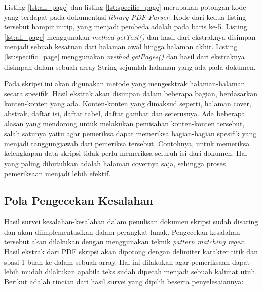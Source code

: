 Listing \ref{lst:all_page} dan listing \ref{lst:specific_page} merupakan potongan kode yang terdapat pada dokumentasi \textit{library PDF Parser}. Kode dari kedua listing tersebut hampir mirip, yang menjadi pembeda adalah pada baris ke-5. Listing \ref{lst:all_page} menggunakan \textit{method getText()} dan hasil dari ekstraknya disimpan menjadi sebuah kesatuan dari halaman awal hingga halaman akhir. Listing \ref{lst:specific_page} menggunakan \textit{method getPages()} dan hasil dari ekstraknya disimpan dalam sebuah array String sejumlah halaman yang ada pada dokumen.

Pada skripsi ini akan digunakan metode yang mengesktrak halaman-halaman secara spesifik. Hasil ekstrak akan disimpan dalam beberapa bagian, berdasarkan konten-konten yang ada. Konten-konten yang dimaksud seperti, halaman cover, abstrak, daftar isi, daftar tabel, daftar gambar dan seterusnya. Ada beberapa alasan yang mendorong untuk melakukan pemisahan konten-konten tersebut, salah satunya yaitu agar pemeriksa dapat memeriksa bagian-bagian spesifik yang menjadi tanggungjawab dari pemeriksa tersebut. Contohnya, untuk memeriksa kelengkapan data skripsi tidak perlu memeriksa seluruh isi dari dokumen. Hal yang paling dibutuhkan adalah halaman covernya saja, sehingga proses pemeriksaan menjadi lebih efektif.

\subsection{Pola Pengecekan Kesalahan}
Hasil survei kesalahan-kesalahan dalam penulisan dokumen skripsi sudah disaring dan akan diimplementasikan dalam perangkat lunak. Pengecekan kesalahan tersebut akan dilakukan dengan menggunakan teknik \textit{pattern matching regex}. Hasil ekstrak dari PDF skripsi akan dipotong dengan delimiter karakter titik dan spasi 1 buah ke dalam sebuah array. Hal ini dilakukan agar pemeriksaan dapat lebih mudah dilakukan apabila teks sudah dipecah menjadi sebuah kalimat utuh. Berikut adalah rincian dari hasil survei yang dipilih beserta penyelesaiannya:

